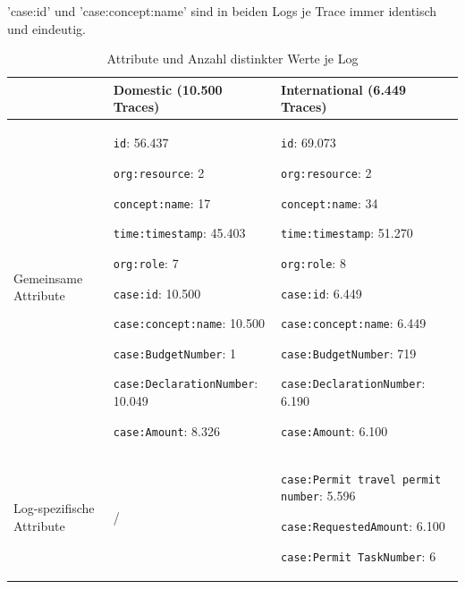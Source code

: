 'case:id' und 'case:concept:name' sind in beiden Logs je Trace immer identisch und eindeutig.
\begin{table}[htbp]
    \centering
    \vspace{-0.5cm}
    \caption{Attribute und Anzahl distinkter Werte je Log}
    \vspace{-0.3cm}
    \label{tab:attribut-maechtigkeiten}
    \scriptsize
    \renewcommand{\arraystretch}{1}
    \begin{tabularx}{\textwidth}{@{}p{2cm}XX@{}}
        \toprule
        & \textbf{Domestic (10.500 Traces)} & \textbf{International (6.449 Traces)} \\
        \midrule
        Gemeinsame Attribute
        & \texttt{id}: 56.437\par
          \texttt{org:resource}: 2\par
          \texttt{concept:name}: 17\par
          \texttt{time:timestamp}: 45.403\par
          \texttt{org:role}: 7\par
          \texttt{case:id}: 10.500\par
          \texttt{case:concept:name}: 10.500\par
          \texttt{case:BudgetNumber}: 1\par
          \texttt{case:DeclarationNumber}: 10.049\par
          \texttt{case:Amount}: 8.326
        & \texttt{id}: 69.073\par
          \texttt{org:resource}: 2\par
          \texttt{concept:name}: 34\par
          \texttt{time:timestamp}: 51.270\par
          \texttt{org:role}: 8\par
          \texttt{case:id}: 6.449\par
          \texttt{case:concept:name}: 6.449\par
          \texttt{case:BudgetNumber}: 719\par
          \texttt{case:DeclarationNumber}: 6.190\par
          \texttt{case:Amount}: 6.100 \\
        \midrule
        Log-spezifische Attribute
        & /
        & \texttt{case:Permit travel permit number}: 5.596\par
          \texttt{case:RequestedAmount}: 6.100\par
          \texttt{case:Permit TaskNumber}: 6\par

\end{tabularx}
\end{table}
